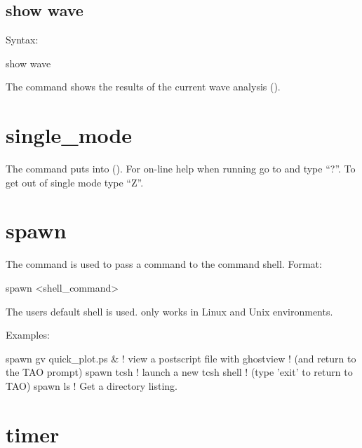 {{{{{{{{{%

\subsection{show wave}
\label{s:show.wave}

Syntax:
\begin{example}
  show wave
\end{example}

The  command shows the results of the current wave analysis ().


\section{single_mode}
\label{s:sing}

The  command puts \tao into  ().
For on-line help when running \tao go to  and type ``?''.
To get out of single mode type ``Z''.

\section{spawn}
\label{s:spawn}

The  command is used to pass a command to the command shell. Format:
\begin{example}
  spawn <shell_command>
\end{example}

The users default shell is used.  only works in Linux and Unix environments.

Examples:
\begin{example}
  spawn gv quick_plot.ps &      ! view a postscript file with ghostview
                                ! (and return to the TAO prompt)
  spawn tcsh                    ! launch a new tcsh shell 
                                ! (type 'exit' to return to TAO)
  spawn ls                      ! Get a directory listing.
\end{example}


\section{timer}
\label{s:timer}

}}}}}}}}}
